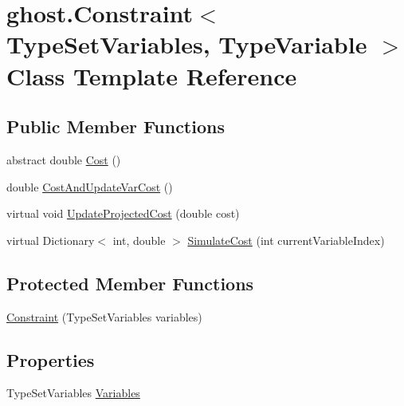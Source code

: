 \hypertarget{classghost_1_1Constraint_3_01TypeSetVariables_00_01TypeVariable_01_4}{\section{ghost.\-Constraint$<$ Type\-Set\-Variables, Type\-Variable $>$ Class Template Reference}
\label{classghost_1_1Constraint_3_01TypeSetVariables_00_01TypeVariable_01_4}
}
\subsection*{Public Member Functions}
\begin{DoxyCompactItemize}
\item 
abstract double \hyperlink{classghost_1_1Constraint_3_01TypeSetVariables_00_01TypeVariable_01_4_a372fdc84eedb800db45371a85e5861f2}{Cost} ()
\item 
double \hyperlink{classghost_1_1Constraint_3_01TypeSetVariables_00_01TypeVariable_01_4_a0196ae3cd8cd41e32b045c8651c79038}{Cost\-And\-Update\-Var\-Cost} ()
\item 
virtual void \hyperlink{classghost_1_1Constraint_3_01TypeSetVariables_00_01TypeVariable_01_4_a31f197e25cb1314cebba3dcde04bde82}{Update\-Projected\-Cost} (double cost)
\item 
virtual Dictionary$<$ int, double $>$ \hyperlink{classghost_1_1Constraint_3_01TypeSetVariables_00_01TypeVariable_01_4_a1be83ccf89d4f028dd49e3f26a79a255}{Simulate\-Cost} (int current\-Variable\-Index)
\end{DoxyCompactItemize}
\subsection*{Protected Member Functions}
\begin{DoxyCompactItemize}
\item 
\hyperlink{classghost_1_1Constraint_3_01TypeSetVariables_00_01TypeVariable_01_4_af5f29309c2d8a5874f8e89d9237ae156}{Constraint} (Type\-Set\-Variables variables)
\end{DoxyCompactItemize}
\subsection*{Properties}
\begin{DoxyCompactItemize}
\item 
Type\-Set\-Variables \hyperlink{classghost_1_1Constraint_3_01TypeSetVariables_00_01TypeVariable_01_4_a22327beeea2a2d774f85477a9fdd7b55}{Variables}
\end{DoxyCompactItemize}


